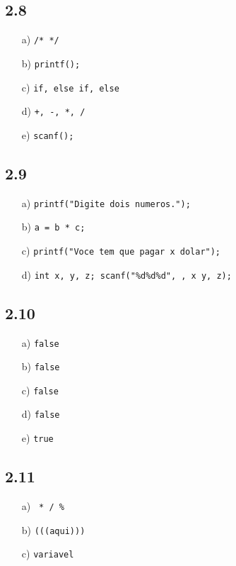 \documentclass[a4paper,12pt]{article}
\begin{document}
\subsection*{2.8}
\begin{enumerate}
    \item[a)] \texttt{/* */}

    \item[b)] \texttt{printf();}

    \item[c)] \texttt{if, else if, else}

    \item[d)] \texttt{+, -, *, /}

    \item[e)] \texttt{scanf();}
\end{enumerate}
\subsection*{2.9}
\begin{enumerate}
    \item[a)] \texttt{printf("Digite dois numeros.");}

    \item[b)] \texttt{a = b * c;}

    \item[c)] \texttt{printf("Voce tem que pagar x dolar");}

    \item[d)] \texttt{int x, y, z; scanf("\%d\%d\%d", , x y, z);}
\end{enumerate}
\subsection*{2.10}
\begin{enumerate}
    \item[a)] \texttt{false}
    \item[b)] \texttt{false}
    \item[c)] \texttt{false}
    \item[d)] \texttt{false}
    \item[e)] \texttt{true}
\end{enumerate}
\subsection*{2.11}
\begin{enumerate}
    \item[a)] \texttt{ * / \%}
    \item[b)] \texttt{(((aqui)))}
    \item[c)] \texttt{variavel}
\end{enumerate}
\end{document}
